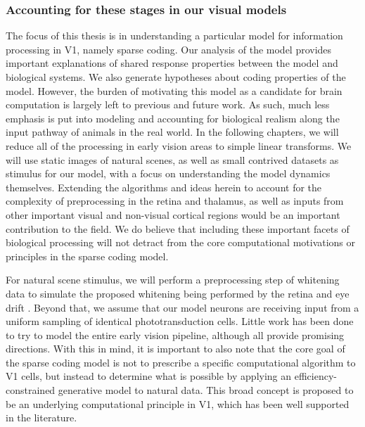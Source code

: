 \subsubsection{Accounting for these stages in our visual models}
The focus of this thesis is in understanding a particular model for information processing in V1, namely sparse coding. Our analysis of the model provides important explanations of shared response properties between the model and biological systems. We also generate hypotheses about coding properties of the model. However, the burden of motivating this model as a candidate for brain computation is largely left to previous and future work. As such, much less emphasis is put into modeling and accounting for biological realism along the input pathway of animals in the real world. In the following chapters, we will reduce all of the processing in early vision areas to simple linear transforms. We will use static images of natural scenes, as well as small contrived datasets as stimulus for our model, with a focus on understanding the model dynamics themselves. Extending the algorithms and ideas herein to account for the complexity of preprocessing in the retina and thalamus, as well as inputs from other important visual and non-visual cortical regions would be an important contribution to the field. We do believe that including these important facets of biological processing will not detract from the core computational motivations or principles in the sparse coding model.

For natural scene stimulus, we will perform a preprocessing step of whitening data  \citeyearpar{olshausen1997sparse} to simulate the proposed whitening being performed by the retina and eye drift \parencite{atick1992what, rucci2015unsteady}. Beyond that, we assume that our model neurons are receiving input from a uniform sampling of identical phototransduction cells. Little work has been done to try to model the entire early vision pipeline, although \parencite{shan2013efficient, doi2007theory, lindsey2019unified} all provide promising directions. With this in mind, it is important to also note that the core goal of the sparse coding model is not to prescribe a specific computational algorithm to V1 cells, but instead to determine what is possible by applying an efficiency-constrained generative model to natural data. This broad concept is proposed to be an underlying computational principle in V1, which has been well supported in the literature.

